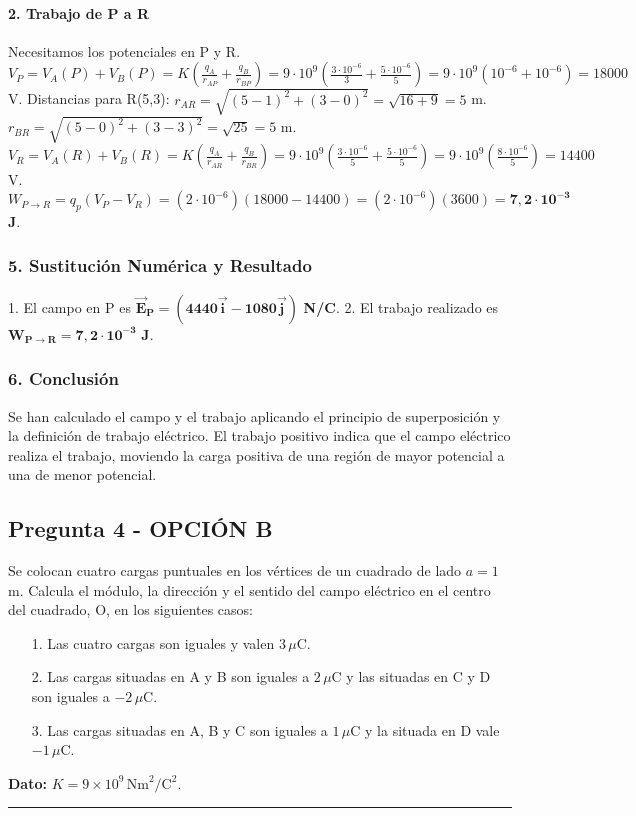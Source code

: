 \paragraph*{2. Trabajo de P a R}
Necesitamos los potenciales en P y R.
$V_P = V_A(P) + V_B(P) = K(\frac{q_A}{r_{AP}} + \frac{q_B}{r_{BP}}) = 9\cdot10^9(\frac{3\cdot10^{-6}}{3} + \frac{5\cdot10^{-6}}{5}) = 9\cdot10^9(10^{-6}+10^{-6}) = 18000$ V.
Distancias para R(5,3):
$r_{AR} = \sqrt{(5-1)^2+(3-0)^2} = \sqrt{16+9}=5$ m.
$r_{BR} = \sqrt{(5-0)^2+(3-3)^2} = \sqrt{25}=5$ m.
$V_R = V_A(R) + V_B(R) = K(\frac{q_A}{r_{AR}} + \frac{q_B}{r_{BR}}) = 9\cdot10^9(\frac{3\cdot10^{-6}}{5} + \frac{5\cdot10^{-6}}{5}) = 9\cdot10^9(\frac{8\cdot10^{-6}}{5}) = 14400$ V.
$W_{P \to R} = q_p(V_P - V_R) = (2\cdot10^{-6})(18000 - 14400) = (2\cdot10^{-6})(3600) = \boldsymbol{7,2 \cdot 10^{-3}}$ \textbf{J}.

\subsubsection*{5. Sustitución Numérica y Resultado}
\begin{cajaresultado}
1. El campo en P es $\boldsymbol{\vec{E}_P = (4440\vec{i} - 1080\vec{j})}$ \textbf{N/C}.
2. El trabajo realizado es $\boldsymbol{W_{P \to R} = 7,2 \cdot 10^{-3}}$ \textbf{J}.
\end{cajaresultado}

\subsubsection*{6. Conclusión}
\begin{cajaconclusion}
Se han calculado el campo y el trabajo aplicando el principio de superposición y la definición de trabajo eléctrico. El trabajo positivo indica que el campo eléctrico realiza el trabajo, moviendo la carga positiva de una región de mayor potencial a una de menor potencial.
\end{cajaconclusion}

\newpage

\subsection{Pregunta 4 - OPCIÓN B}
\label{subsec:4B_2003_sep_ext}

\begin{cajaenunciado}
Se colocan cuatro cargas puntuales en los vértices de un cuadrado de lado $a=1$ m. Calcula el módulo, la dirección y el sentido del campo eléctrico en el centro del cuadrado, O, en los siguientes casos:
\begin{enumerate}
    \item[1.] Las cuatro cargas son iguales y valen $3\,\mu\text{C}$.
    \item[2.] Las cargas situadas en A y B son iguales a $2\,\mu\text{C}$ y las situadas en C y D son iguales a $-2\,\mu\text{C}$.
    \item[3.] Las cargas situadas en A, B y C son iguales a $1\,\mu\text{C}$ y la situada en D vale $-1\,\mu\text{C}$.
\end{enumerate}
\textbf{Dato:} $K=9\times10^9\,\text{Nm}^2/\text{C}^2$.
\end{cajaenunciado}
\hrule

